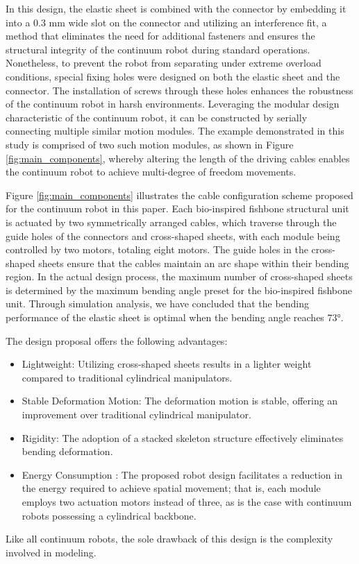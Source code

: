 In this design, the elastic sheet is combined with the connector by embedding it into a 0.3 mm wide slot on the connector 
and utilizing an interference fit, a method that eliminates the need for additional fasteners and ensures the structural 
integrity of the continuum robot during standard operations. Nonetheless, to prevent the robot from separating under 
extreme overload conditions, special fixing holes were designed on both the elastic sheet and the connector. The 
installation of screws through these holes enhances the robustness of the continuum robot in harsh environments. 
Leveraging the modular design characteristic of the continuum robot, it can be constructed by serially connecting 
multiple similar motion modules. The example demonstrated in this study is comprised of two such motion modules, as 
shown in Figure \ref{fig:main_components}, whereby altering the length of the driving cables enables the continuum 
robot to achieve multi-degree of freedom movements.

Figure \ref{fig:main_components} illustrates the cable configuration scheme proposed for the continuum robot in this 
paper. Each bio-inspired fishbone structural unit is actuated by two symmetrically arranged cables, which traverse 
through the guide holes of the connectors and cross-shaped sheets, with each module being controlled by two motors, 
totaling eight motors. The guide holes in the cross-shaped sheets ensure that the cables maintain an arc shape within 
their bending region. In the actual design process, the maximum number of cross-shaped sheets is determined by the 
maximum bending angle preset for the bio-inspired fishbone unit. Through simulation analysis, we have concluded that 
the bending performance of the elastic sheet is optimal when the bending angle reaches 73°. 

The design proposal offers the following advantages: 

\begin{itemize}
    \item Lightweight: Utilizing cross-shaped sheets results in a lighter weight compared to traditional cylindrical manipulators.
    \item Stable Deformation Motion: The deformation motion is stable, offering an improvement over traditional cylindrical manipulator.
    \item Rigidity: The adoption of a stacked skeleton structure effectively eliminates bending deformation.
    \item Energy Consumption \cite{bio_noval_method}: The proposed robot design facilitates a reduction in the energy required to achieve spatial movement; that is, each module employs two actuation motors instead of three, as is the case with continuum robots possessing a cylindrical backbone.
\end{itemize}
Like all continuum robots, the sole drawback of this design is the complexity involved in modeling.
